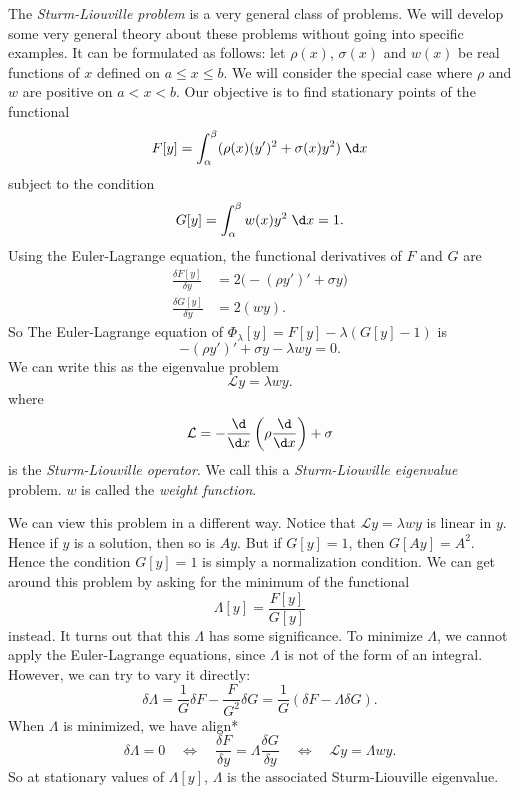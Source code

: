 \documentclass[a4paper]{article}
\begin{document}
\begin{eg}
  The \emph{Sturm-Liouville problem} is a very general class of problems. We will develop some very general theory about these problems without going into specific examples. It can be formulated as follows: let $\rho(x)$, $\sigma(x)$ and $w(x)$ be real functions of $x$ defined on $a \leq x \leq b$. We will consider the special case where $\rho$ and $w$ are positive on $a < x < b$. Our objective is to find stationary points of the functional
  \[
    F[y] = \int_\alpha^\beta (\rho(x)(y')^2 + \sigma(x)y^2)\;\d x
  \]
  subject to the condition
  \[
    G[y] = \int_\alpha^\beta w(x)y^2\;\d x = 1.
  \]
  Using the Euler-Lagrange equation, the functional derivatives of $F$ and $G$ are
  \begin{align*}
    \frac{\delta F[y]}{\delta y} &= 2\big(-(\rho y')' + \sigma y\big)\\
    \frac{\delta G[y]}{\delta y} &= 2 (wy).
  \end{align*}
  So The Euler-Lagrange equation of $\Phi_\lambda [y] = F[y] - \lambda(G[y] - 1)$ is
  \[
    -(\rho y')' + \sigma y - \lambda wy = 0.
  \]
  We can write this as the eigenvalue problem
  \[
    \mathcal{L}y = \lambda wy.
  \]
  where
  \[
    \mathcal{L} = -\frac{\d}{\d x}\left(\rho\frac{\d}{\d x}\right) + \sigma
  \]
  is the \emph{Sturm-Liouville operator}. We call this a \emph{Sturm-Liouville eigenvalue} problem. $w$ is called the \emph{weight function}.

  We can view this problem in a different way. Notice that $\mathcal{L} y = \lambda wy$ is linear in $y$. Hence if $y$ is a solution, then so is $Ay$. But if $G[y] = 1$, then $G[Ay] = A^2$. Hence the condition $G[y] = 1$ is simply a normalization condition. We can get around this problem by asking for the minimum of the functional
  \[
    \Lambda [y] = \frac{F[y]}{G[y]}
  \]
  instead. It turns out that this $\Lambda$ has some significance. To minimize $\Lambda$, we cannot apply the Euler-Lagrange equations, since $\Lambda$ is not of the form of an integral. However, we can try to vary it directly:
  \[
    \delta\Lambda = \frac{1}{G}\delta F - \frac{F}{G^2} \delta G = \frac{1}{G}(\delta F - \Lambda \delta G).
  \]
  When $\Lambda$ is minimized, we have
  align*
  \[
    \delta \Lambda = 0 \quad\Leftrightarrow\quad \frac{\delta F}{\delta y} = \Lambda \frac{\delta G}{\delta y}\quad \Leftrightarrow\quad \mathcal{L} y = \Lambda wy.
  \]
  So at stationary values of $\Lambda[y]$, $\Lambda$ is the associated Sturm-Liouville eigenvalue.
\end{eg}
\end{document}
